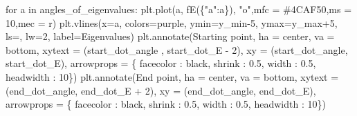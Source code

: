 \documentclass[
  letterpaper,
  DIV=11,
  numbers=noendperiod]{scrartcl}
\newenvironment{Shaded}{\begin{snugshade}}{\end{snugshade}}
\newcommand{\ControlFlowTok}[1]{\textcolor[rgb]{0.00,0.23,0.31}{#1}}
\newcommand{\DecValTok}[1]{\textcolor[rgb]{0.68,0.00,0.00}{#1}}
\newcommand{\FloatTok}[1]{\textcolor[rgb]{0.68,0.00,0.00}{#1}}
\newcommand{\KeywordTok}[1]{\textcolor[rgb]{0.00,0.23,0.31}{#1}}
\newcommand{\NormalTok}[1]{\textcolor[rgb]{0.00,0.23,0.31}{#1}}
\newcommand{\OperatorTok}[1]{\textcolor[rgb]{0.37,0.37,0.37}{#1}}
\newcommand{\StringTok}[1]{\textcolor[rgb]{0.13,0.47,0.30}{#1}}
\begin{document}
\begin{Shaded}
\begin{Highlighting}[]
        \ControlFlowTok{for}\NormalTok{ a }\KeywordTok{in}\NormalTok{ angles\_of\_eigenvalues:}
\NormalTok{            plt.plot(a, fE(\{}\StringTok{"a"}\NormalTok{:a\}), }\StringTok{"o"}\NormalTok{,mfc }\OperatorTok{=} \StringTok{\textquotesingle{}\#4CAF50\textquotesingle{}}\NormalTok{,ms }\OperatorTok{=} \DecValTok{10}\NormalTok{,mec }\OperatorTok{=} \StringTok{\textquotesingle{}r\textquotesingle{}}\NormalTok{)}
\NormalTok{            plt.vlines(x}\OperatorTok{=}\NormalTok{a, colors}\OperatorTok{=}\StringTok{\textquotesingle{}purple\textquotesingle{}}\NormalTok{, ymin}\OperatorTok{=}\NormalTok{y\_min}\OperatorTok{{-}}\DecValTok{5}\NormalTok{, ymax}\OperatorTok{=}\NormalTok{y\_max}\OperatorTok{+}\DecValTok{5}\NormalTok{, ls}\OperatorTok{=}\StringTok{\textquotesingle{}{-}{-}\textquotesingle{}}\NormalTok{, lw}\OperatorTok{=}\DecValTok{2}\NormalTok{, label}\OperatorTok{=}\StringTok{\textquotesingle{}Eigenvalues\textquotesingle{}}\NormalTok{)}
\NormalTok{        plt.annotate(}\StringTok{\textquotesingle{}Starting point\textquotesingle{}}\NormalTok{,}
\NormalTok{        ha }\OperatorTok{=} \StringTok{\textquotesingle{}center\textquotesingle{}}\NormalTok{, va }\OperatorTok{=} \StringTok{\textquotesingle{}bottom\textquotesingle{}}\NormalTok{,}
\NormalTok{        xytext }\OperatorTok{=}\NormalTok{ (start\_dot\_angle , start\_dot\_E }\OperatorTok{{-}} \DecValTok{2}\NormalTok{),}
\NormalTok{        xy }\OperatorTok{=}\NormalTok{ (start\_dot\_angle, start\_dot\_E),}
\NormalTok{        arrowprops }\OperatorTok{=}\NormalTok{ \{ }\StringTok{\textquotesingle{}facecolor\textquotesingle{}}\NormalTok{ : }\StringTok{\textquotesingle{}black\textquotesingle{}}\NormalTok{, }\StringTok{\textquotesingle{}shrink\textquotesingle{}}\NormalTok{ : }\FloatTok{0.5}\NormalTok{, }\StringTok{\textquotesingle{}width\textquotesingle{}}\NormalTok{ : }\FloatTok{0.5}\NormalTok{, }\StringTok{\textquotesingle{}headwidth\textquotesingle{}}\NormalTok{ : }\DecValTok{10}\NormalTok{\})}
\NormalTok{        plt.annotate(}\StringTok{\textquotesingle{}End point\textquotesingle{}}\NormalTok{,}
\NormalTok{        ha }\OperatorTok{=} \StringTok{\textquotesingle{}center\textquotesingle{}}\NormalTok{, va }\OperatorTok{=} \StringTok{\textquotesingle{}bottom\textquotesingle{}}\NormalTok{,}
\NormalTok{        xytext }\OperatorTok{=}\NormalTok{ (end\_dot\_angle, end\_dot\_E }\OperatorTok{+} \DecValTok{2}\NormalTok{),}
\NormalTok{        xy }\OperatorTok{=}\NormalTok{ (end\_dot\_angle, end\_dot\_E),}
\NormalTok{        arrowprops }\OperatorTok{=}\NormalTok{ \{ }\StringTok{\textquotesingle{}facecolor\textquotesingle{}}\NormalTok{ : }\StringTok{\textquotesingle{}black\textquotesingle{}}\NormalTok{, }\StringTok{\textquotesingle{}shrink\textquotesingle{}}\NormalTok{ : }\FloatTok{0.5}\NormalTok{, }\StringTok{\textquotesingle{}width\textquotesingle{}}\NormalTok{ : }\FloatTok{0.5}\NormalTok{, }\StringTok{\textquotesingle{}headwidth\textquotesingle{}}\NormalTok{ : }\DecValTok{10}\NormalTok{\})}
        

\end{Highlighting}
\end{Shaded}
\end{document}
